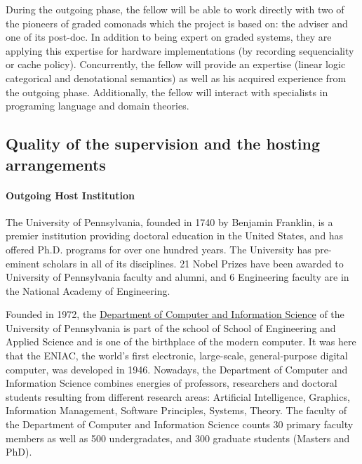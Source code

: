 \documentclass{article}[11pt]
\begin{document}
During the outgoing phase, the fellow will be able to work directly with two of the pioneers of graded comonads which the project is based on: the adviser and one of its post-doc. In addition to being expert on graded systems, they are applying this expertise for hardware implementations (by recording sequenciality or cache policy). Concurrently, the fellow will provide an expertise (linear logic categorical and denotational semantics) as well as his acquired experience from the outgoing phase. Additionally, the fellow will interact with specialists in programing language and domain theories.





\subsection{Quality of the supervision and the hosting arrangements}
\paragraph{Outgoing Host Institution}
The University of Pennsylvania, founded in 1740 by Benjamin Franklin, is a premier institution providing doctoral education in the United States, and has offered Ph.D. programs for over one hundred years. The University has pre-eminent scholars in all of its disciplines. 21 Nobel Prizes have been awarded to University of Pennsylvania faculty and alumni, and 6 Engineering faculty are in the National Academy of Engineering.

Founded in 1972, the \href{http://www.cis.upenn.edu/index.php}{Department of Computer and Information Science} of the University of Pennsylvania is part of the school of School of Engineering and Applied Science and is one of the birthplace of the modern computer. It was here that the ENIAC, the world's first electronic, large-scale, general-purpose
digital computer, was developed in 1946. Nowadays, the Department of Computer and
Information Science combines energies of professors, researchers and doctoral students resulting
from different research areas: Artificial Intelligence, Graphics, Information Management,
Software Principles, Systems, Theory. The faculty of the Department of Computer and
Information Science counts 30 primary faculty members as well as 500 undergradates, and 300 graduate students (Masters and PhD).
\end{document}
